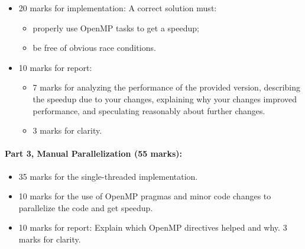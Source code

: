 \documentclass[letterpaper,10pt]{article}
\begin{document}
\begin{itemize}
\item 20 marks for implementation: A correct solution must:
\begin{itemize}
	\item properly use OpenMP tasks to get a speedup;
	\item be free of obvious race conditions.
\end{itemize}
\item 10 marks for report: 
\begin{itemize}
\item 7 marks for analyzing the performance
of the provided version, describing the speedup due to your
changes, explaining why your changes improved performance, and
speculating reasonably about further changes. 
\item 3 marks for clarity.
\end{itemize}
\end{itemize}

\paragraph{Part 3, Manual Parallelization (55 marks):} 
\begin{itemize}
\item 35 marks for the single-threaded implementation. 

\item 10 marks for the use of OpenMP pragmas and minor code changes to parallelize the code and get speedup.

\item 10 marks for report: Explain which OpenMP directives helped and why. 3 marks for clarity.
\end{itemize}
\end{document}
